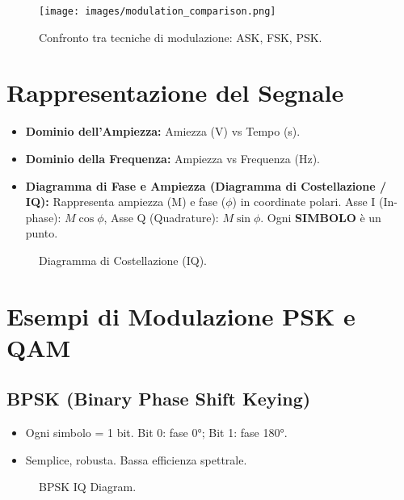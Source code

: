 \begin{figure}[H]
\centering
\texttt{[image: images/modulation\_comparison.png]}
\caption{Confronto tra tecniche di modulazione: ASK, FSK, PSK.}
\label{fig:modulation_comparison}
\end{figure}

\section{Rappresentazione del Segnale}
\begin{itemize}
    \item \textbf{Dominio dell'Ampiezza:} Amiezza (V) vs Tempo (s).
    \item \textbf{Dominio della Frequenza:} Ampiezza vs Frequenza (Hz).
    \item \textbf{Diagramma di Fase e Ampiezza (Diagramma di Costellazione / IQ):}
    Rappresenta ampiezza (M) e fase ($\phi$) in coordinate polari. Asse I (In-phase): $M \cos \phi$, Asse Q (Quadrature): $M \sin \phi$. Ogni \textbf{SIMBOLO} è un punto.
\end{itemize}
\begin{figure}[H]
\centering
{}
\caption{Diagramma di Costellazione (IQ).}
\label{fig:iq_diagram}
\end{figure}

\section{Esempi di Modulazione PSK e QAM}
\subsection{BPSK (Binary Phase Shift Keying)}
\begin{itemize}
    \item Ogni simbolo = 1 bit. Bit 0: fase 0°; Bit 1: fase 180°.
    \item Semplice, robusta. Bassa efficienza spettrale.
\end{itemize}
\begin{figure}[H] \centering
{}
\caption{BPSK IQ Diagram.}
\end{figure}


